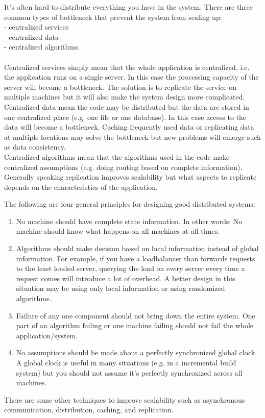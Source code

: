 \documentclass[twoside]{article}
\begin{document}
It's often hard to distribute everything you have in the system. There are three common types of bottleneck that prevent the system from scaling up: 
\\- centralized services
\\- centralized data
\\- centralized algorithms. 
\\\\
Centralized services simply mean that the whole application is centralized, i.e. the application runs on a single server. In this case the processing capacity of the server will become a bottleneck. The solution is to replicate the service on multiple machines but it will also make the system design more complicated. 
\\Centralized data mean the code may be distributed but the data are stored in one centralized place (e.g. one file or one database). In this case access to the data will become a bottleneck. Caching frequently used data or replicating data at multiple locations may solve the bottleneck but new problems will emerge such as data consistency.\\
Centralized algorithms mean that the algorithms used in the code make centralized assumptions (e.g. doing routing based on complete information). 
Generally speaking replication improves scalability but what aspects to replicate depends on the characteristics of the application.

The following are four general principles for designing good distributed systems: \begin{enumerate}
\item No machine should have complete state information. In other words: No machine should know what happens on all machines at all times.
\item Algorithms should make decision based on local information instead of global information. For example, if you have a loadbalancer than forwards requests to the least loaded server, querying the load on every server every time a request comes will introduce a lot of overhead. A better design in this situation may be using only local information or using randomized algorithms.
\item Failure of any one component should not bring down the entire system. One part of an algorithm failing or one machine failing should not fail the whole application/system.
\item No assumptions should be made about a perfectly synchronized global clock. A global clock is useful in many situations (e.g. in a incremental build system) but you should not assume it's perfectly synchronized across all machines.
\end{enumerate}
There are some other techniques to improve scalability such as asynchronous communication, distribution, caching, and replication.
\end{document}
